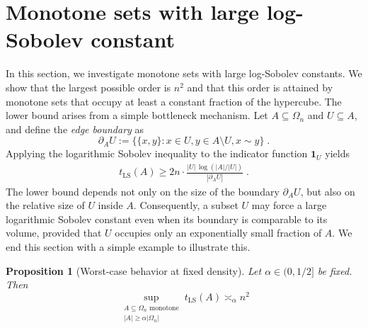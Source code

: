 \documentclass[12pt,final]{amsart}
\newcommand{\1}{\mathbf{1}}
\newtheorem{proposition}[theorem]{Proposition}
\begin{document}
\section{Monotone sets with large log-Sobolev constant}\label{sec:large-LSI}

In this section, we investigate monotone sets with large log-Sobolev constants. We show that the largest possible order is $n^2$ and that this order is attained by monotone sets that occupy at least a constant fraction of the hypercube. The lower bound arises from a simple bottleneck mechanism. Let $A\subseteq \Omega_n$ and $U\subseteq A$, and define the \emph{edge boundary} as 
\[
\partial_{A}U :=\{\{x, y\}: x\in U, y\in A\setminus U, x\sim y\}\;.
\] 
Applying the logarithmic Sobolev inequality to the indicator function $\mathbf{1}_U$ yields 
\begin{align}\label{equation: universal lower bound}
    t_{\operatorname{LS}}(A)\geq 2n\cdot \frac{|U|\,\log (|A|/|U|)}{|\partial_AU|}\;.
\end{align}
The lower bound depends not only on the size of the boundary $\partial_AU$, but also on the relative size of $U$ inside $A$. Consequently, a subset $U$ may force a large logarithmic Sobolev constant even when its boundary is comparable to its volume, provided that $U$ occupies only an exponentially small fraction of $A$. We end this section with a simple example to illustrate this. 

\begin{proposition}[Worst-case behavior at fixed density]\label{prop:wortcase-LSI}
    Let $\alpha\in (0,1/2]$ be fixed. Then 
    $$
     \sup_{\substack{A\subseteq \Omega_n \text{ monotone}\\ |A|\geq \alpha |\Omega_n|} }t_{\operatorname{LS}}(A)  \asymp_\alpha n^2
    $$
\end{proposition}
\end{document}
